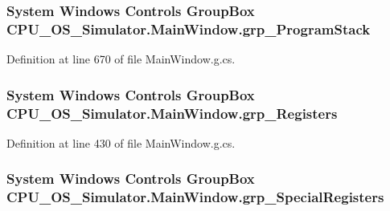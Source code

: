 \subsubsection[{grp\+\_\+\+Program\+Stack}]{\setlength{\rightskip}{0pt plus 5cm}System Windows Controls Group\+Box C\+P\+U\+\_\+\+O\+S\+\_\+\+Simulator.\+Main\+Window.\+grp\+\_\+\+Program\+Stack\hspace{0.3cm}{\ttfamily [package]}}\label{class_c_p_u___o_s___simulator_1_1_main_window_a10687b397ff3a0381a556096a14ed0b0}


Definition at line 670 of file Main\+Window.\+g.\+cs.

\hypertarget{class_c_p_u___o_s___simulator_1_1_main_window_af858add509dfe2b90f0d356822f73737}{}
\subsubsection[{grp\+\_\+\+Registers}]{\setlength{\rightskip}{0pt plus 5cm}System Windows Controls Group\+Box C\+P\+U\+\_\+\+O\+S\+\_\+\+Simulator.\+Main\+Window.\+grp\+\_\+\+Registers\hspace{0.3cm}{\ttfamily [package]}}\label{class_c_p_u___o_s___simulator_1_1_main_window_af858add509dfe2b90f0d356822f73737}


Definition at line 430 of file Main\+Window.\+g.\+cs.

\hypertarget{class_c_p_u___o_s___simulator_1_1_main_window_a02e4a81d8689928cb1d459fd3c01bfdf}{}
\subsubsection[{grp\+\_\+\+Special\+Registers}]{\setlength{\rightskip}{0pt plus 5cm}System Windows Controls Group\+Box C\+P\+U\+\_\+\+O\+S\+\_\+\+Simulator.\+Main\+Window.\+grp\+\_\+\+Special\+Registers\hspace{0.3cm}{\ttfamily [package]}}\label{class_c_p_u___o_s___simulator_1_1_main_window_a02e4a81d8689928cb1d459fd3c01bfdf}


